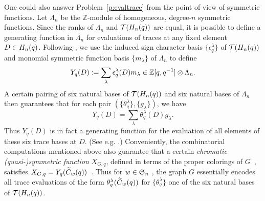 \documentclass[11pt]{article}
\theoremstyle{definition}
\numberwithin{equation}{section}
\begin{document}
One could also answer Problem~\ref{p:evaltrace}
from the point of view of symmetric functions.
Let $\Lambda_n$ be the $\mathbb Z$-module of homogeneous, degree-$n$
symmetric functions.
Since the ranks of $\Lambda_n$ and $\mathcal{T}(H_n(q))$ are
equal,
it is possible to define
a generating function in $\Lambda_n$
for evaluations of traces at
any fixed element $D \in H_n(q)$.
Following \cite[\S 2]{SkanCCS},
we use
the induced sign character basis $\{\epsilon_q^\lambda\}$ of $\mathcal{T}(H_n(q))$
and monomial symmetric function basis $\{ m_\lambda \}$ of $\Lambda_n$
to define
\begin{equation*}
  Y_q(D) := \sum_\lambda
  \epsilon_q^\lambda (D) m_\lambda \in \mathbb{Z}[q, q^{-1}] \otimes \Lambda_n.
\end{equation*}
A certain pairing of six natural bases of $\mathcal{T}(H_n(q))$
and six natural bases of $\Lambda_n$ then guarantees that for each pair
$(\{ \theta_q^\lambda \}, \{ g_\lambda \})$,
we have
\begin{equation*}
  Y_q(D) = \sum_\lambda \theta_q^\lambda(D) g_\lambda.
\end{equation*}
Thus $Y_q(D)$ is in fact a generating function for the evaluation
of all elements of these six trace bases
at $D$. (See e.g. \cite[Prop.\,2.1]{SkanCCS}.)
Conveniently, the combinatorial computations mentioned above also
guarantee
that a certain
{\em chromatic (quasi-)symmetric function}
$X_{G,q}$, defined in terms of the proper colorings of $G$~\cite{SWachsChromQ},
satisfies $X_{G,q} = Y_q(\widetilde{C}_{w}(q))$~\cite[Thm.\,7.4]{CHSSkanEKL}.
Thus for $w \in \mathfrak{S}_n$ \avoidingp,
the graph $G$ essentially encodes all trace evaluations of the
form $\theta_q^\lambda(\widetilde{C}_{w}(q))$ for $\{ \theta_q^\lambda \}$ one of the six natural
bases of $\mathcal{T}(H_n(q))$.
\end{document}
